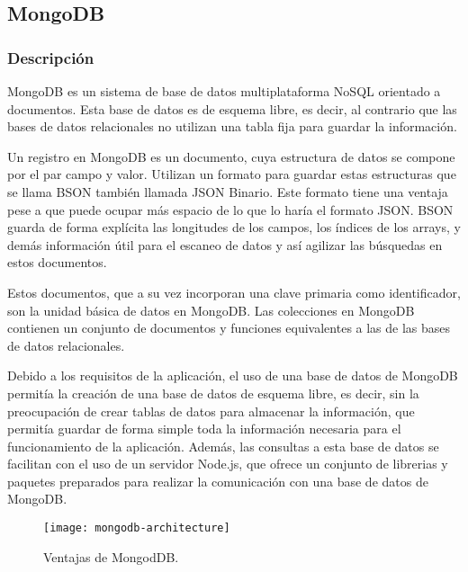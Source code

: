 \subsection{MongoDB}

\subsubsection{ Descripción }

MongoDB  \cite{URL::MongoDB} es un sistema de base de datos multiplataforma NoSQL   \cite{URL::NoSQL} orientado a documentos. Esta base de datos es de esquema libre, es decir, al contrario que las bases de datos relacionales no utilizan una tabla fija para guardar la información.

Un registro en MongoDB es un documento, cuya estructura de datos se compone por el par campo y valor. Utilizan un formato para guardar estas estructuras que se llama BSON  \cite{URL::BSON} también llamada JSON \cite{URL::json} Binario. Este formato tiene una ventaja pese a que puede ocupar más espacio de lo que lo haría el formato JSON. BSON guarda de forma explícita las longitudes de los campos, los índices de los arrays, y demás información útil para el escaneo de datos y así agilizar las búsquedas en estos documentos.

Estos documentos, que a su vez incorporan una clave primaria como identificador, son la unidad básica de datos en MongoDB. Las colecciones en MongoDB contienen un conjunto de documentos y funciones equivalentes a las de las bases de datos relacionales.

Debido a los requisitos de la aplicación, el uso de una base de datos de MongoDB
permitía la creación de una base de datos de esquema libre, es decir, sin la preocupación de crear tablas de datos para almacenar la información, que permitía guardar de forma simple toda la información necesaria para 
el funcionamiento de la aplicación. 
Además, las consultas a esta base de datos se facilitan con el uso de un servidor Node.js, que ofrece un conjunto de librerias y paquetes preparados para realizar la comunicación con una base de datos de MongoDB.


\begin{figure}[h]
    \centering
    \texttt{[image: mongodb-architecture]}
    \caption{ Ventajas de MongodDB. }
    \label{fig:mongoDBarquitectura}
\end{figure}



